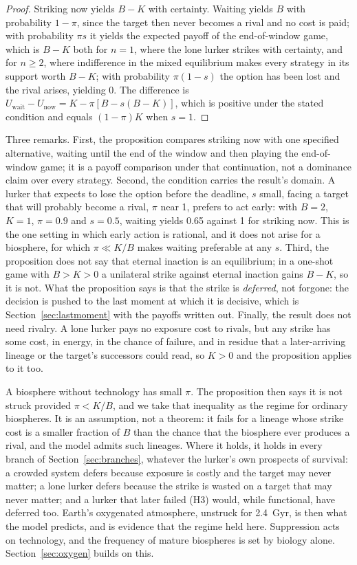 \documentclass[preprint,12pt]{elsarticle}
\theoremstyle{definition}
\begin{document}
\begin{proof}
Striking now yields $B - K$ with certainty. Waiting yields $B$ with probability $1 - \pi$, since the target then never becomes a rival and no cost is paid; with probability $\pi s$ it yields the expected payoff of the end-of-window game, which is $B - K$ both for $n = 1$, where the lone lurker strikes with certainty, and for $n \geq 2$, where indifference in the mixed equilibrium makes every strategy in its support worth $B - K$; with probability $\pi(1-s)$ the option has been lost and the rival arises, yielding $0$. The difference is $U_{\mathrm{wait}} - U_{\mathrm{now}} = K - \pi[B - s(B-K)]$, which is positive under the stated condition and equals $(1-\pi)K$ when $s = 1$.
\end{proof}

Three remarks. First, the proposition compares striking now with one specified alternative, waiting until the end of the window and then playing the end-of-window game; it is a payoff comparison under that continuation, not a dominance claim over every strategy. Second, the condition carries the result's domain. A lurker that expects to lose the option before the deadline, $s$ small, facing a target that will probably become a rival, $\pi$ near 1, prefers to act early: with $B = 2$, $K = 1$, $\pi = 0.9$ and $s = 0.5$, waiting yields 0.65 against 1 for striking now. This is the one setting in which early action is rational, and it does not arise for a biosphere, for which $\pi \ll K/B$ makes waiting preferable at any $s$. Third, the proposition does not say that eternal inaction is an equilibrium; in a one-shot game with $B > K > 0$ a unilateral strike against eternal inaction gains $B - K$, so it is not. What the proposition says is that the strike is \emph{deferred}, not forgone: the decision is pushed to the last moment at which it is decisive, which is Section~\ref{sec:lastmoment} with the payoffs written out. Finally, the result does not need rivalry. A lone lurker pays no exposure cost to rivals, but any strike has some cost, in energy, in the chance of failure, and in residue that a later-arriving lineage or the target's successors could read, so $K > 0$ and the proposition applies to it too.

A biosphere without technology has small $\pi$. The proposition then says it is not struck provided $\pi < K/B$, and we take that inequality as the regime for ordinary biospheres. It is an assumption, not a theorem: it fails for a lineage whose strike cost is a smaller fraction of $B$ than the chance that the biosphere ever produces a rival, and the model admits such lineages. Where it holds, it holds in every branch of Section~\ref{sec:branches}, whatever the lurker's own prospects of survival: a crowded system defers because exposure is costly and the target may never matter; a lone lurker defers because the strike is wasted on a target that may never matter; and a lurker that later failed (H3) would, while functional, have deferred too. Earth's oxygenated atmosphere, unstruck for 2.4~Gyr, is then what the model predicts, and is evidence that the regime held here. Suppression acts on technology, and the frequency of mature biospheres is set by biology alone. Section~\ref{sec:oxygen} builds on this.
\end{document}
